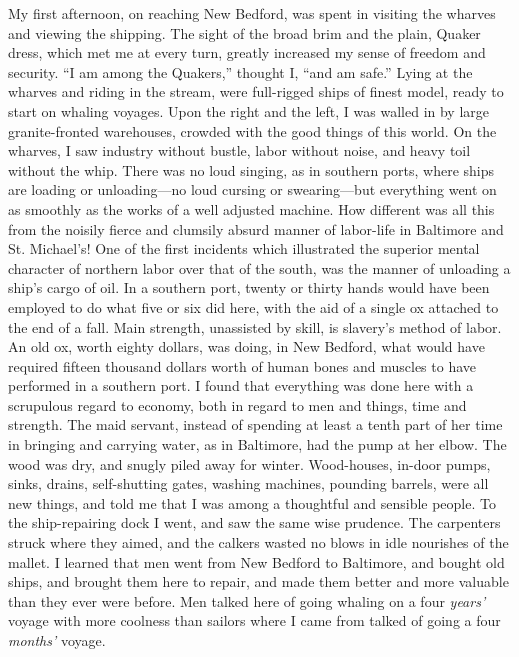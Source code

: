 My first afternoon, on reaching New Bedford, was spent in visiting the
wharves and viewing the shipping. The sight of the broad brim and the
plain, Quaker dress, which met me at every turn, greatly increased my
sense of freedom and security. ``I am among the Quakers,'' thought I,
``and am safe.'' Lying at the wharves and riding in the stream, were
full-rigged ships of finest model, ready to start on whaling voyages.
Upon the right and the left, I was walled in by large granite-fronted
warehouses, crowded with the good things of this world. On the wharves,
I saw industry without bustle, labor without noise, and heavy toil
without the whip. There was no loud singing, as in southern ports, where
ships are loading or unloading---no loud cursing or swearing---but
everything went on as smoothly as the works of a well adjusted machine.
How different was all this from the noisily fierce and clumsily absurd
manner of labor-life in Baltimore and St. Michael's! One of the first
incidents which illustrated the superior mental character of northern
labor over that of the south, was the manner of unloading a ship's cargo
of oil. In a southern port, twenty or thirty hands would have been
employed to do what five or six did here, with the aid of a single ox
attached to the end of a fall. Main strength, unassisted by skill, is
slavery's method of labor. An old ox, worth eighty dollars, was doing,
in New Bedford, what would have required fifteen thousand dollars
{}worth of human bones and muscles to have performed in a southern port.
I found that everything was done here with a scrupulous regard to
economy, both in regard to men and things, time and strength. The maid
servant, instead of spending at least a tenth part of her time in
bringing and carrying water, as in Baltimore, had the pump at her elbow.
The wood was dry, and snugly piled away for winter. Wood-houses, in-door
pumps, sinks, drains, self-shutting gates, washing machines, pounding
barrels, were all new things, and told me that I was among a thoughtful
and sensible people. To the ship-repairing dock I went, and saw the same
wise prudence. The carpenters struck where they aimed, and the calkers
wasted no blows in idle nourishes of the mallet. I learned that men went
from New Bedford to Baltimore, and bought old ships, and brought them
here to repair, and made them better and more valuable than they ever
were before. Men talked here of going whaling on a four \emph{years{'}}
voyage with more coolness than sailors where I came from talked of going
a four \emph{months{'}} voyage.

